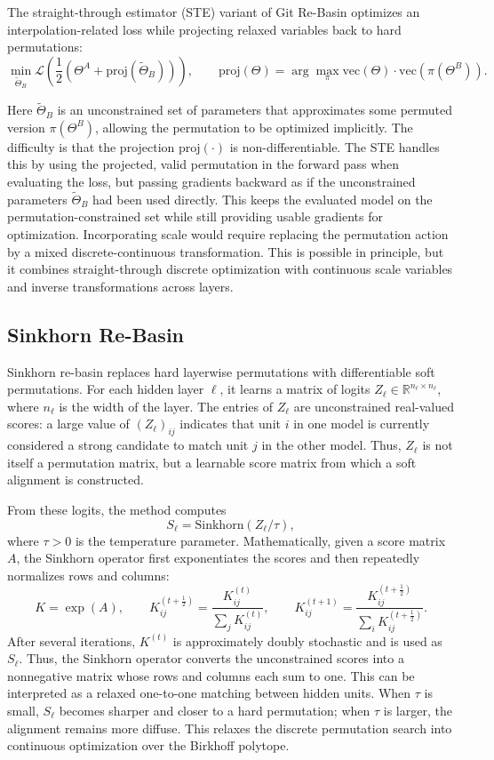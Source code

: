 \documentclass[11pt,a4paper]{report}
\begin{document}
The straight-through estimator (STE) variant of Git Re-Basin optimizes an interpolation-related loss while projecting relaxed variables back to hard permutations:
\[
\min_{\widetilde{\Theta}_B}
\mathcal{L}\!\left(\frac{1}{2}(\Theta^A+\mathrm{proj}(\widetilde{\Theta}_B))\right),
\qquad
\mathrm{proj}(\Theta)
=
\arg\max_{\pi}
\mathrm{vec}(\Theta)\cdot\mathrm{vec}(\pi(\Theta^B)).
\]

Here \(\widetilde{\Theta}_B\) is an unconstrained set of parameters that approximates some permuted version \(\pi(\Theta^B)\), allowing the permutation to be optimized implicitly. The difficulty is that the projection \(\mathrm{proj}(\cdot)\) is non-differentiable. The STE handles this by using the projected, valid permutation in the forward pass when evaluating the loss, but passing gradients backward as if the unconstrained parameters \(\widetilde{\Theta}_B\) had been used directly. This keeps the evaluated model on the permutation-constrained set while still providing usable gradients for optimization.
Incorporating scale would require replacing the permutation action by a mixed discrete-continuous transformation. This is possible in principle, but it combines straight-through discrete optimization with continuous scale variables and inverse transformations across layers.

\subsection{Sinkhorn Re-Basin}

Sinkhorn re-basin replaces hard layerwise permutations with differentiable soft permutations. For each hidden layer \(\ell\), it learns a matrix of logits \(Z_\ell \in \mathbb{R}^{n_\ell \times n_\ell}\), where \(n_\ell\) is the width of the layer. The entries of \(Z_\ell\) are unconstrained real-valued scores: a large value of \((Z_\ell)_{ij}\) indicates that unit \(i\) in one model is currently considered a strong candidate to match unit \(j\) in the other model. Thus, \(Z_\ell\) is not itself a permutation matrix, but a learnable score matrix from which a soft alignment is constructed.

From these logits, the method computes
\[
S_\ell=\mathrm{Sinkhorn}(Z_\ell/\tau),
\]
where \(\tau>0\) is the temperature parameter. Mathematically, given a score matrix \(A\), the Sinkhorn operator first exponentiates the scores and then repeatedly normalizes rows and columns:
\[
K=\exp(A),\qquad
K^{(t+\frac{1}{2})}_{ij}
=
\frac{K^{(t)}_{ij}}{\sum_j K^{(t)}_{ij}},
\qquad
K^{(t+1)}_{ij}
=
\frac{K^{(t+\frac{1}{2})}_{ij}}{\sum_i K^{(t+\frac{1}{2})}_{ij}}.
\]
After several iterations, \(K^{(t)}\) is approximately doubly stochastic and is used as \(S_\ell\). Thus, the Sinkhorn operator converts the unconstrained scores into a nonnegative matrix whose rows and columns each sum to one. This can be interpreted as a relaxed one-to-one matching between hidden units. When \(\tau\) is small, \(S_\ell\) becomes sharper and closer to a hard permutation; when \(\tau\) is larger, the alignment remains more diffuse. This relaxes the discrete permutation search into continuous optimization over the Birkhoff polytope.
\end{document}
